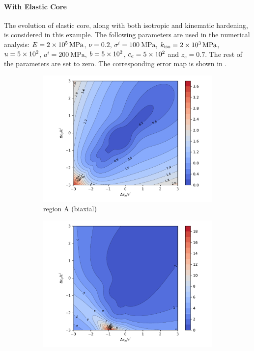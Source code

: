 \paragraph{With Elastic Core}
The evolution of elastic core, along with both isotropic and kinematic hardening, is considered in this example.
The following parameters are used in the numerical analysis: $E=\SI{2E5}{\mega\pascal}$, $\nu=0.2$, $\sigma^i=\SI{100}{\mega\pascal}$, $k_\text{iso}=\SI{2E3}{\mega\pascal}$, $u=\num{5E2}$, $a^i=\SI{200}{\mega\pascal}$, $b=\num{5E2}$, $c_e=\num{5E2}$ and $z_e=\num{0.7}$.
The rest of the parameters are set to zero.
The corresponding error map is shown in .
\begin{figure}[htb]
\centering
\begin{subfigure}{.48\textwidth}\centering
    \includegraphics[width=.99\textwidth]{PIC/ISOMAP/error.core.biaxial.pdf}
    \caption{region A (biaxial)}\label{fig:error_euler_with_core_a}
\end{subfigure}\hfill
\begin{subfigure}{.48\textwidth}\centering
    \includegraphics[width=.99\textwidth]{PIC/ISOMAP/error.core.uniaxial.pdf}

\end{subfigure}
\end{figure}
